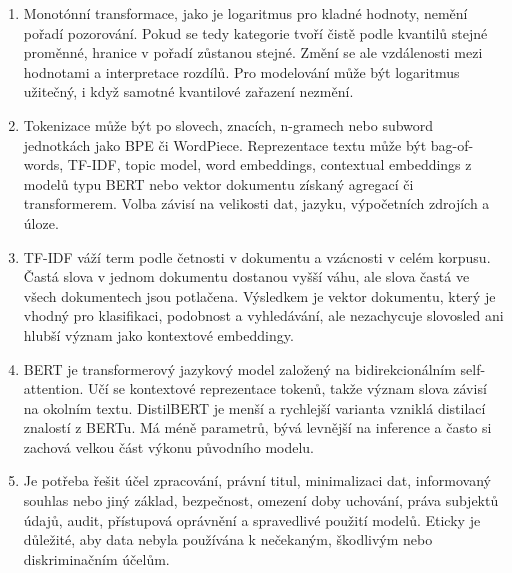 \documentclass[12pt,a4paper]{article}
\begin{document}
\begin{enumerate}
  \item {}

  Monotónní transformace, jako je logaritmus pro kladné hodnoty, nemění pořadí pozorování. Pokud se
  tedy kategorie tvoří čistě podle kvantilů stejné proměnné, hranice v pořadí zůstanou stejné. Změní
  se ale vzdálenosti mezi hodnotami a interpretace rozdílů. Pro modelování může být logaritmus užitečný,
  i když samotné kvantilové zařazení nezmění.

  \item {}

  Tokenizace může být po slovech, znacích, n-gramech nebo subword jednotkách jako BPE či WordPiece.
  Reprezentace textu může být bag-of-words, TF-IDF, topic model, word embeddings, contextual embeddings
  z modelů typu BERT nebo vektor dokumentu získaný agregací či transformerem. Volba závisí na velikosti
  dat, jazyku, výpočetních zdrojích a úloze.

  \item {}

  TF-IDF váží term podle četnosti v dokumentu a vzácnosti v celém korpusu. Častá slova v jednom
  dokumentu dostanou vyšší váhu, ale slova častá ve všech dokumentech jsou potlačena. Výsledkem je
  vektor dokumentu, který je vhodný pro klasifikaci, podobnost a vyhledávání, ale nezachycuje slovosled
  ani hlubší význam jako kontextové embeddingy.

  \item {}

  BERT je transformerový jazykový model založený na bidirekcionálním self-attention. Učí se kontextové
  reprezentace tokenů, takže význam slova závisí na okolním textu. DistilBERT je menší a rychlejší
  varianta vzniklá distilací znalostí z BERTu. Má méně parametrů, bývá levnější na inference a často
  si zachová velkou část výkonu původního modelu.

  \item {}

  Je potřeba řešit účel zpracování, právní titul, minimalizaci dat, informovaný souhlas nebo jiný
  základ, bezpečnost, omezení doby uchování, práva subjektů údajů, audit, přístupová oprávnění a
  spravedlivé použití modelů. Eticky je důležité, aby data nebyla používána k nečekaným, škodlivým
  nebo diskriminačním účelům.


\end{enumerate}
\end{document}

